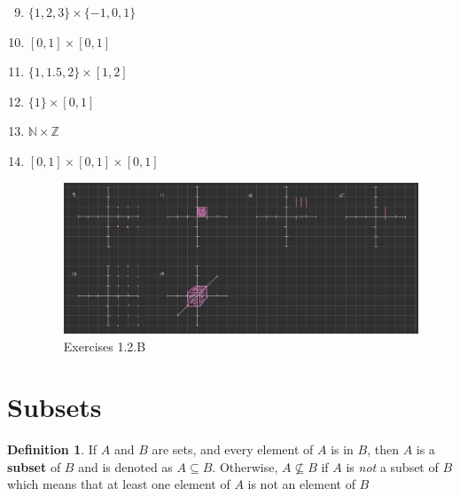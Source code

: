 \documentclass[10pt]{article}
\newcommand{\N}{\mathbb{N}}
\newcommand{\Z}{\mathbb{Z}}
\theoremstyle{definition}
\newtheorem{definition}{Definition}
\begin{document}
\begin{enumerate}[label=\Alph*.]
\begin{enumerate}[label=\arabic*.]
                \setcounter{enumii}{8}
            \item $\{1,2,3\} \times \{-1,0,1\}$
            \item $[0,1]\times[0,1]$
            \item $\{1,1.5,2\}\times[1,2]$
            \item $\{1\}\times[0,1]$
            \item $\N \times \Z$
            \item $[0,1]\times[0,1]\times[0,1]$
                \begin{figure}
                    \centering
                    \includegraphics[width=0.75\linewidth]{images/exercise_1_2_B.jpg}
                    \caption{Exercises 1.2.B}
                \end{figure}
        \end{enumerate}
\end{enumerate}

\section{Subsets}
\begin{definition}
    If $A$ and $B$ are sets, and every element of $A$ is in $B$, then $A$ is a \textbf{subset} of $B$ and is denoted as $A \subseteq B$. Otherwise, $A \not\subseteq B$ if $A$ is \textit{not} a subset of $B$ which means that at least one element of $A$ is not an element of $B$
\end{definition}
\end{document}
